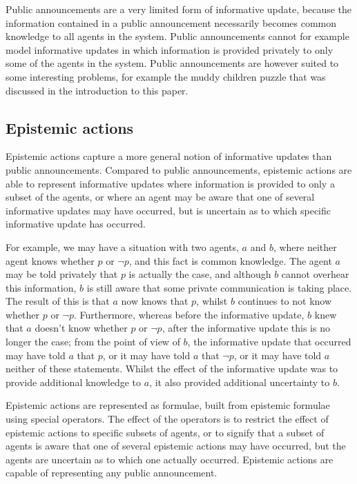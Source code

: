 Public announcements are a very limited form of informative update, because the
information contained in a public announcement necessarily becomes common
knowledge to all agents in the system. Public announcements cannot for example
model informative updates in which information is provided privately to only
some of the agents in the system. Public announcements are however suited to
some interesting problems, for example the muddy children puzzle that was
discussed in the introduction to this paper.

\subsection*{Epistemic actions}

Epistemic actions capture a more general notion of informative updates than
public announcements. Compared to public announcements, epistemic actions are
able to represent informative updates where information is provided to only a
subset of the agents, or where an agent may be aware that one of several
informative updates may have occurred, but is uncertain as to which specific
informative update has occurred. 

For example, we may have a situation with two agents, $a$ and $b$, where neither
agent knows whether $p$ or $\neg p$, and this fact is common knowledge. The
agent $a$ may be told privately that $p$ is actually the case, and although $b$
cannot overhear this information, $b$ is still aware that some private
communication is taking place. The result of this is that $a$ now knows that
$p$, whilst $b$ continues to not know whether $p$ or $\neg p$. Furthermore,
whereas before the informative update, $b$ knew that $a$ doesn't know whether
$p$ or $\neg p$, after the informative update this is no longer the case; from
the point of view of $b$, the informative update that occurred may have told $a$
that $p$, or it may have told $a$ that $\neg p$, or it may have told $a$
neither of these statements. Whilst the effect of the informative update was to
provide additional knowledge to $a$, it also provided additional uncertainty to
$b$.

Epistemic actions are represented as formulae, built from epistemic formulae
using special operators. The effect of the operators is to restrict the effect
of epistemic actions to specific subsets of agents, or to signify that a subset
of agents is aware that one of several epistemic actions may have occurred, but
the agents are uncertain as to which one actually occurred. Epistemic actions
are capable of representing any public announcement.

